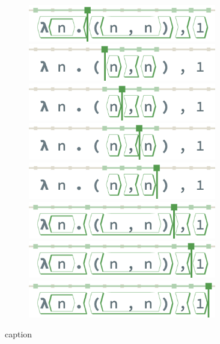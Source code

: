 \begin{figure}
\begin{subfigure}[c]{0.49\columnwidth}
    \includegraphics[width=0.9\textwidth]{img/pan-tiles-3.png}
    \includegraphics[width=0.9\textwidth]{img/pan-tiles-4.png}
    \includegraphics[width=0.9\textwidth]{img/pan-tiles-5.png}
    \includegraphics[width=0.9\textwidth]{img/pan-tiles-6.png}
    \includegraphics[width=0.9\textwidth]{img/pan-tiles-7.png}
    \includegraphics[width=0.9\textwidth]{img/pan-tiles-8.png}
    \includegraphics[width=0.9\textwidth]{img/pan-tiles-9.png}
    \includegraphics[width=0.9\textwidth]{img/pan-tiles-10.png}
    \caption{}
    \label{fig:pan-tile-view}
  \end{subfigure}
  \caption{caption}
\end{figure}
